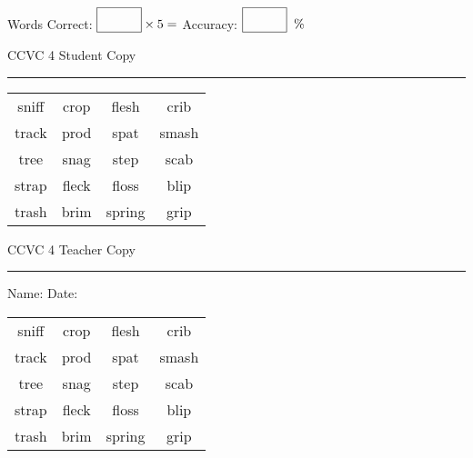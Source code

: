 \documentclass{memoir}
\begin{document}
\small

Words Correct: $\fbox{\phantom{\huge 100}} \times 5 = $ Accuracy: $\fbox{\phantom{\huge 100}}\;\; \%$ 

\vfill

\newpage


\footnotesize \noindent
CCVC 4 \hfill Student Copy
\smallskip
\hrule

\Large

\setlength{\tabcolsep}{14pt}
\def\arraystretch{3}

{\selectfont


\begin{vplace}[0.5]
\begin{center}
\begin{tabular}{cccc}
sniff & crop & flesh             & crib \\
track       & prod & spat            & smash \\
tree & snag & step & scab \\
strap & fleck             & floss & blip \\
trash & brim      & spring & grip      \\
\end{tabular}
\end{center}
\end{vplace}

}

\newpage

\footnotesize \noindent
CCVC 4 \hfill Teacher Copy
\smallskip
\hrule

\small

\vfill

\noindent
Name: \underline{\hspace{1.75in}} \hfill Date: \underline{\hspace{1in}}

\Large

{\selectfont


\begin{vplace}[0.5]
\begin{center}
\begin{tabular}{cccc}
sniff & crop & flesh             & crib \\
track       & prod & spat            & smash \\
tree & snag & step & scab \\
strap & fleck             & floss & blip \\
trash & brim      & spring & grip      \\
\end{tabular}
\end{center}
\end{vplace}



}
\end{document}
